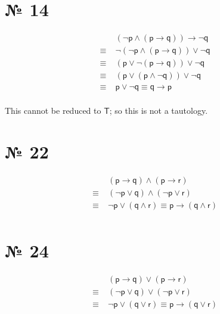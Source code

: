 \documentclass[
   paper=a4,
   fontsize=11pt,
   parskip=no,       %
   fleqn             %
]{scrartcl}
\begin{document}
\begin{multicols}{2}
\raggedcolumns

\section*{№ 14}
   \begin{align*}
               & \mathsf{ (¬p \wedge (p \rightarrow q)) \rightarrow ¬q}             \\
      \equiv\; & \mathsf{¬(¬p \wedge (p \rightarrow q)) \vee ¬q}                    \\
      \equiv\; & \mathsf{(p \vee ¬(p \rightarrow q)) \vee ¬q}                       \\
      \equiv\; & \mathsf{(p \vee (p \wedge ¬q)) \vee ¬q}                            \\
      \equiv\; & \mathsf{p \vee ¬q} \equiv \bm{\mathsf{q \rightarrow p}}            \\
   \end{align*}

   \noindent This cannot be reduced to $\bm{\mathsf{T}}$; so this is not a tautology.

\section*{№ 22}
   \begin{align*}
               & \mathsf{( p \rightarrow q) \wedge (p \rightarrow r)}               \\
      \equiv\; & \mathsf{(¬p \vee        q) \wedge (¬p \vee       r)}               \\
      \equiv\; & \mathsf{ ¬p \vee (q \wedge r) \equiv p \rightarrow (q \wedge r)}   \\
   \end{align*}

\pagebreak[2]
\section*{№ 24}
   \begin{align*}
               & \mathsf{( p \rightarrow q) \vee (p \rightarrow r)}                 \\
      \equiv\; & \mathsf{(¬p \vee        q) \vee (¬p \vee       r)}                 \\
      \equiv\; & \mathsf{ ¬p \vee (q \vee r) \equiv p \rightarrow (q \vee r)}       \\
   \end{align*}

\end{multicols}
\end{document}
